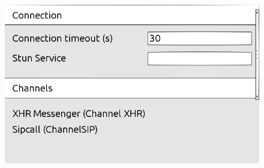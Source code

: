 \begin{landscape}
\begin{figure}[H]
		\label{settings screen}
	\end{figure}
	\begin{figure}[H]
		\centering
		\includegraphics[width=1.4\textwidth]{../ui/img/uiDraft2/Settings view.png}
		\label{settings screen}
	\end{figure}
\end{landscape} 